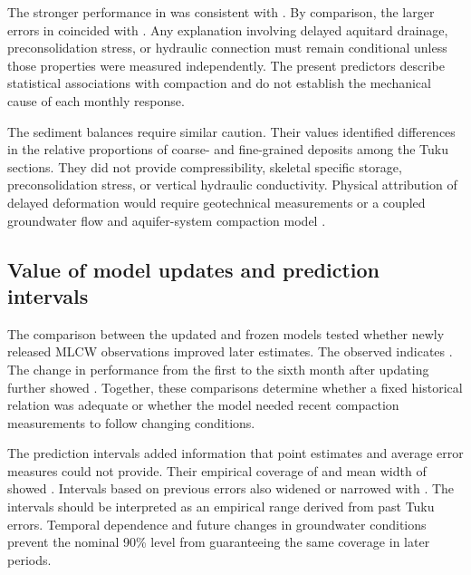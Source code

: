 The stronger performance in  was consistent with . By comparison, the larger errors in  coincided with . Any explanation involving delayed aquitard drainage, preconsolidation stress, or hydraulic connection must remain conditional unless those properties were measured independently. The present predictors describe statistical associations with compaction and do not establish the mechanical cause of each monthly response.

The sediment balances require similar caution. Their values identified differences in the relative proportions of coarse- and fine-grained deposits among the Tuku sections. They did not provide compressibility, skeletal specific storage, preconsolidation stress, or vertical hydraulic conductivity. Physical attribution of delayed deformation would require geotechnical measurements or a coupled groundwater flow and aquifer-system compaction model \citep{galloway_land_1999, hung2012_mlcw}.

\subsection{Value of model updates and prediction intervals}
\label{subsec:discussion_updates}

The comparison between the updated and frozen models tested whether newly released MLCW observations improved later estimates. The observed  indicates . The change in performance from the first to the sixth month after updating further showed . Together, these comparisons determine whether a fixed historical relation was adequate or whether the model needed recent compaction measurements to follow changing conditions.

The prediction intervals added information that point estimates and average error measures could not provide. Their empirical coverage of  and mean width of  showed . Intervals based on previous errors also widened or narrowed with . The intervals should be interpreted as an empirical range derived from past Tuku errors. Temporal dependence and future changes in groundwater conditions prevent the nominal 90\% level from guaranteeing the same coverage in later periods.

